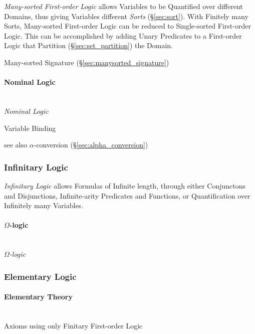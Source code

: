 \emph{Many-sorted First-order Logic} allows Variables to be Quantified
over different Domains, thus giving Variables different \emph{Sorts}
(\S\ref{sec:sort}). With Finitely many Sorts, Many-sorted First-order
Logic can be reduced to Single-sorted First-order Logic. This can be
accomplished by adding Unary Predicates to a First-order Logic that
Partition (\S\ref{sec:set_partition}) the Domain.

Many-sorted Signature (\S\ref{sec:manysorted_signature})


\paragraph{Nominal Logic}\label{sec:nominal_logic}
\hfill \\
\emph{Nominal Logic}

Variable Binding

see also $\alpha$-conversion (\S\ref{sec:alpha_conversion})



\subsubsection{Infinitary Logic}\label{sec:infinitary_logic}

\emph{Infinitary Logic} allows Formulas of Infinite length, through
either Conjunctons and Disjunctions, Infinite-arity Predicates and
Functions, or Quantification over Infinitely many Variables.



\paragraph{$\Omega$-logic}\label{sec:omega_logic}\hfill \\

\emph{$\Omega$-logic}



\subsubsection{Elementary Logic}\label{sec:elementary_logic}

\paragraph{Elementary Theory}\label{sec:elementary_theory}
\hfill \\

Axioms using only Finitary First-order Logic %

